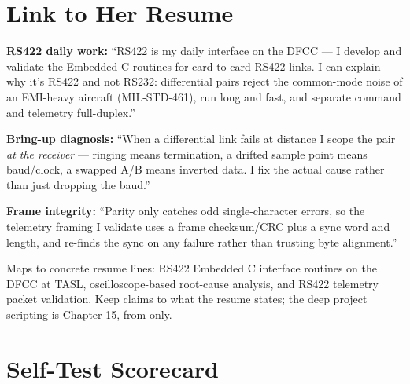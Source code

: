 \section{Link to Her Resume}

\begin{resumelink}
\textbf{RS422 daily work:} ``RS422 is my daily interface on the DFCC --- I
develop and validate the Embedded C routines for card-to-card RS422 links.
I can explain why it's RS422 and not RS232: differential pairs reject the
common-mode noise of an EMI-heavy aircraft (MIL-STD-461), run long and fast,
and separate command and telemetry full-duplex.''

\medskip
\textbf{Bring-up diagnosis:} ``When a differential link fails at distance I
scope the pair \emph{at the receiver} --- ringing means termination, a drifted
sample point means baud/clock, a swapped A/B means inverted data. I fix the
actual cause rather than just dropping the baud.''

\medskip
\textbf{Frame integrity:} ``Parity only catches odd single-character errors, so
the telemetry framing I validate uses a frame checksum/CRC plus a sync word and
length, and re-finds the sync on any failure rather than trusting byte
alignment.''

\medskip
\small Maps to concrete resume lines: RS422 Embedded C interface routines on the
DFCC at TASL, oscilloscope-based root-cause analysis, and RS422 telemetry packet
validation. Keep claims to what the resume states; the deep project scripting is
Chapter 15, from  only.
\end{resumelink}

\section{Self-Test Scorecard}

